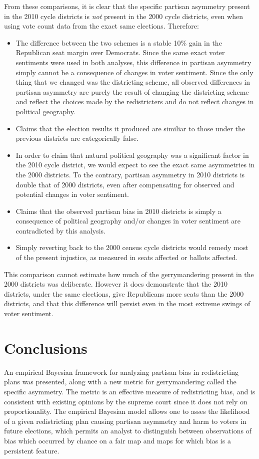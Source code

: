 \documentclass[preprint,12pt]{article}
\begin{document}
From these comparisons, it is clear that the specific partisan asymmetry present in the 2010 cycle districts is \emph{not} present in the 2000 cycle districts, even when using vote count data from the exact same elections.  Therefore:
\begin{itemize}

\item The difference between the two schemes is a stable 10\% gain in the Republican seat margin over Democrats.
Since the same exact voter sentiments were used in both analyses, this difference in partisan asymmetry simply cannot be a consequence of changes in voter sentiment.  
Since the only thing that we changed was the districting scheme, all observed differences in partisan asymmetry are purely the result of changing the districting scheme and reflect the choices made by the redistricters and do not reflect changes in political geography.
\item Claims that the election results it produced are similiar to those under the previous districts are categorically false.
\item In order to claim that natural political geography was a significant factor in the 2010 cycle district, we would expect to see the exact same asymmetries in the 2000 districts.
To the contrary, partisan asymmetry in 2010 districts is double that of 2000 districts, even after compensating for observed and potential changes in voter sentiment.
\item Claims that the observed partisan bias in 2010 districts is simply a consequence of political geography and/or changes in voter sentiment are contradicted by this analysis.
\item Simply reverting back to the 2000 census cycle districts would remedy most of the present injustice, as measured in seats affected or ballots affected.
\end{itemize}

This comparison cannot estimate how much of the gerrymandering present in the 2000 districts was deliberate.
However it does demonstrate that the 2010 districts, under the same elections, give Republicans more seats than the 2000 districts, and that this difference will persist even in the most extreme swings of voter sentiment.

\section{Conclusions}
An empirical Bayesian framework for analyzing partisan bias in redistricting plans was presented, along with a new metric for gerrymandering called the specific asymmetry.
The metric is an effective measure of redistricting bias, and is consistent with existing opinions by the supreme court since it does not rely on proportionality.
The empirical Bayesian model allows one to asses the likelihood of a given redistricting plan causing partisan asymmetry and harm to voters in future elections, which permits an analyst to distinguish between observations of bias which occurred by chance on a fair map and maps for which bias is a persistent feature.
\end{document}
